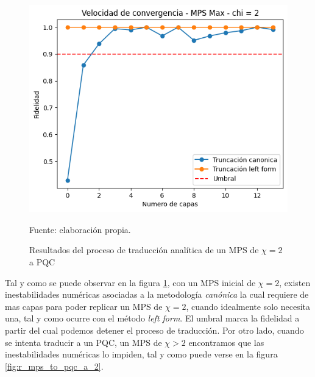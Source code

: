 \begin{figure}[!h]
    \centering
    \includegraphics[scale = 0.6]{plt/a02-mps_to_pqc_a.png}
    \caption{Resultados del proceso de traducción analítica de un MPS de $\chi = 2$ a PQC}
    Fuente: elaboración propia.
    \label{fig:r_mps_to_pqc_a}
\end{figure}

\newpage

Tal y como se puede observar en la figura \ref{fig:r_mps_to_pqc_a}, con un MPS inicial de $\chi = 2$, existen inestabilidades numéricas asociadas a la metodología  \textit{canónica} la cual requiere de mas capas para poder replicar un MPS de $\chi = 2$, cuando idealmente solo necesita una, tal y como ocurre con el método \textit{left form}. El umbral marca la fidelidad a partir del cual podemos detener el proceso de traducción. Por otro lado, cuando se intenta traducir a un PQC, un MPS de $\chi > 2$ encontramos que las inestabilidades numéricas lo impiden, tal y como puede verse en la figura \ref{fig:r_mps_to_pqc_a_2}.


